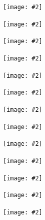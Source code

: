 \documentclass[UKenglish,usenames,dvipsnames,svgnames,table,aspectratio=169,mathserif]{beamer}
\newcommand{\imageslide}[2][1]{{
\begin{frame}\begin{center}
\texttt{[image: \#2]}
\end{center}\end{frame}
}}
\begin{document}


\imageslide[0.6]{sudoku/sudoku1.png}
\imageslide[0.6]{sudoku/sudoku2.png}
\imageslide[0.6]{sudoku/sudoku3.png}
\imageslide[0.6]{sudoku/sudoku4.png}
\imageslide[0.6]{sudoku/sudoku5.png}
\imageslide[0.6]{sudoku/sudoku6.png}
\imageslide[0.6]{sudoku/sudoku7.png}
\imageslide[0.6]{sudoku/sudoku8.png}
\imageslide[0.6]{sudoku/sudoku9.png}
\imageslide[0.6]{sudoku/sudoku10.png}
\imageslide[0.6]{sudoku/sudoku11.png}
\imageslide[0.6]{sudoku/sudoku12.png}
\imageslide[0.6]{sudoku/sudoku13.png}
\end{document}
